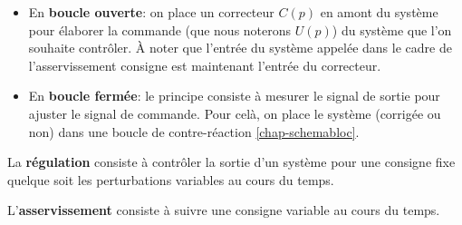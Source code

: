 \begin{itemize}
    \item En \textbf{boucle ouverte}: on place un correcteur $C(p)$
          en amont du système pour élaborer 
          la commande (que nous noterons $U(p)$) du système que l'on 
          souhaite contrôler. \`A noter que l'entrée du système appelée 
          dans le cadre de l'asservissement consigne est maintenant 
          l'entrée du correcteur.

\begin{center}
\end{center}

    \item En \textbf{boucle fermée}: le principe consiste à mesurer le signal 
          de sortie pour ajuster le signal de commande. Pour celà, on place le
          système (corrigée ou non) dans une boucle de contre-réaction 
          \cref{chap-schemabloc}.

\begin{center}
\end{center}

\end{itemize}


La \textbf{régulation} consiste à contrôler la sortie d'un système
pour une consigne fixe quelque soit les perturbations variables au 
cours du temps.

L'\textbf{asservissement} consiste à suivre une consigne variable 
au cours du temps.

